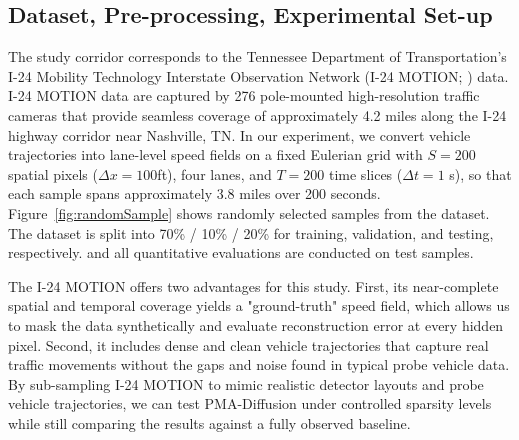\documentclass[a4paper,fleqn]{cas-sc}
\newcommand{\jin}[1]{\textcolor{magenta}{[ZJ: #1]}}
\newcommand{\chois}[1]{\textcolor{green}{[SC: #1]}}
\numberwithin{equation}{section}
\begin{document}
\subsection{Dataset, Pre-processing, Experimental Set-up}

The study corridor corresponds to the Tennessee Department of Transportation's I-24 Mobility Technology Interstate Observation Network (I-24 MOTION; \cite{gloudemans202324}) data. I-24 MOTION data are captured by 276 pole-mounted high-resolution traffic cameras that provide seamless coverage of approximately 4.2 miles along the I-24 highway corridor near Nashville, TN. 
In our experiment, we convert vehicle trajectories into lane-level speed fields on a fixed Eulerian grid with $S=200$ spatial pixels ($\Delta x\!=\!100$ft), four lanes, and $T=200$ time slices ($\Delta t\!=\!1$ s), so that each sample spans approximately 3.8 miles over 200 seconds. Figure~\ref{fig:randomSample} shows randomly selected samples from the dataset. The dataset is split into 70\% / 10\% / 20\% for training, validation, and testing, respectively. and all quantitative evaluations are conducted on test samples.

The I-24 MOTION offers two advantages for this study. First, its near-complete spatial and temporal coverage yields a "ground-truth" speed field, which allows us to mask the data synthetically and evaluate reconstruction error at every hidden pixel. Second, it includes dense and clean vehicle trajectories that capture real traffic movements without the gaps and noise found in typical probe vehicle data. By sub-sampling I-24 MOTION to mimic realistic detector layouts and probe vehicle trajectories, we can test PMA-Diffusion under controlled sparsity levels while still comparing the results against a fully observed baseline.
\end{document}
